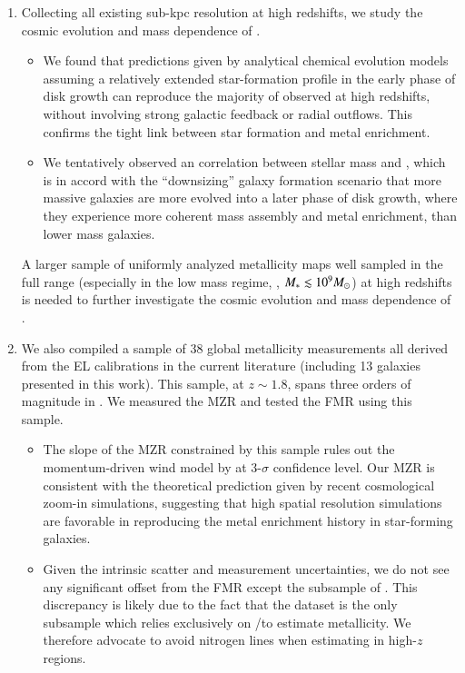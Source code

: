 \begin{enumerate}
    \item Collecting all existing sub-kpc resolution \mgms at high redshifts, we study the cosmic evolution and mass dependence of 
    \mgs.
        \begin{itemize}
            \item We found that predictions given by analytical chemical evolution models assuming a relatively extended
            star-formation profile in the early phase of disk growth can reproduce the majority of observed \mgs at high 
            redshifts, without involving strong galactic feedback or radial outflows. This confirms the tight link between star formation and metal enrichment.
            \item We tentatively observed an correlation between stellar mass and \mg, which is in accord with the ``downsizing''
            galaxy formation scenario that more massive galaxies are more evolved into a later phase of disk growth, where they
            experience more coherent mass assembly and metal enrichment, than lower mass galaxies.
        \end{itemize}
    A larger sample of uniformly analyzed metallicity maps well sampled in the full \Mstar range (especially in the low mass
    regime, \ie, $M_\ast\lesssim10^{9}M_\odot$) at high redshifts is needed to further investigate the cosmic evolution and mass
    dependence of \mgs.

    \item We also compiled a sample of 38 global metallicity measurements all derived from the \citet{2008A&A...488..463M} EL
    calibrations in the current literature (including 13 galaxies presented in this work). This sample, at $z\sim1.8$, spans three
    orders of magnitude in \Mstar. We measured the MZR and tested the FMR using this sample.
        \begin{itemize}
            \item The slope of the MZR constrained by this sample rules out the momentum-driven wind model by
            \citet{2012MNRAS.421...98D} at 3-$\sigma$ confidence level. Our MZR is consistent with the theoretical prediction
            given by recent cosmological zoom-in simulations, suggesting that high spatial resolution simulations are favorable in
            reproducing the metal enrichment history in star-forming galaxies.
            \item Given the intrinsic scatter and measurement uncertainties, we do not see any significant offset from the FMR
            except the subsample of \citet{Wuyts:2012gb}. This discrepancy is likely due to the fact that the \citet{Wuyts:2012gb}
            dataset is the only subsample which relies exclusively on \NII/\Ha to estimate metallicity. We therefore advocate to
            avoid nitrogen lines when estimating \gpm in high-$z$ \HII regions.
        \end{itemize}

\end{enumerate}


